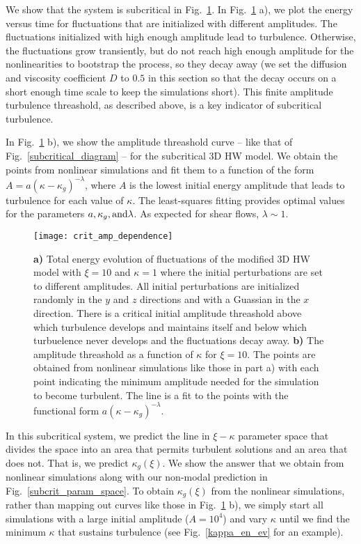\documentclass[twocolumn,showkeys,superscriptaddress]{revtex4}
\begin{document}
We show that the system is subcritical in Fig.~\ref{crit_amp_dependence}. In Fig.~\ref{crit_amp_dependence} a), we plot the energy versus time for fluctuations that are initialized with different amplitudes. 
The fluctuations initialized with high enough amplitude lead to turbulence. 
Otherwise, the fluctuations grow transiently, but do not reach high enough amplitude for the nonlinearities to bootstrap the process,
so they decay away (we set the diffusion and viscosity coefficient $D$ to $0.5$ in this section so that the decay occurs on a short enough time scale to keep the simulations short). 
This finite amplitude turbulence threashold, as described above, is a key indicator of subcritical turbulence.

In Fig.~\ref{crit_amp_dependence} b), we show the amplitude threashold curve -- like that of Fig.~\ref{subcritical_diagram} -- for the subcritical 3D HW model. We obtain the points from nonlinear simulations
and fit them to a function of the form $A = a (\kappa - \kappa_g)^{- \lambda}$, where $A$ is the lowest initial energy amplitude that leads to turbulence for each value of $\kappa$. The least-squares fitting provides optimal values
for the parameters $a, \kappa_g, \rm{and} \lambda$. As expected for shear flows, $\lambda \sim 1$.

\begin{figure}
\centerline{\texttt{[image: crit\_amp\_dependence]}}
\caption{{\bf a)} Total energy evolution of fluctuations of the modified 3D HW model with $\xi=10$ and $\kappa=1$ where the initial perturbations are set to different amplitudes. 
All initial perturbations are initialized randomly in the $y$ and $z$ directions and with a Guassian in the $x$ direction. 
There is a critical initial amplitude threashold above which turbulence develops and maintains itself and below which turbuelence never develops and the fluctuations decay away. 
{\bf b)} The amplitude threashold as a function of $\kappa$ for $\xi=10$. The points are obtained from nonlinear simulations like those in part a) with each point indicating the minimum amplitude needed for the simulation
to become turbulent. The line is a fit to the points with the functional form $a (\kappa-\kappa_g)^{- \lambda}$.}
\label{crit_amp_dependence}
\end{figure}

In this subcritical system, we predict the line in $\xi-\kappa$ parameter space that divides the space into an area that permits turbulent solutions and an area that does not. That is, we predict
$\kappa_g(\xi)$. We show the answer that we obtain from nonlinear simulations along with our non-modal prediction in Fig.~\ref{subcrit_param_space}. To obtain $\kappa_g(\xi)$ from the nonlinear simulations,
rather than mapping out curves like those in Fig.~\ref{crit_amp_dependence} b), we simply start all simulations with a large initial amplitude ($A = 10^4$) and vary $\kappa$ until we find the minimum $\kappa$ that
sustains turbulence (see Fig.~\ref{kappa_en_ev} for an example).
\end{document}

